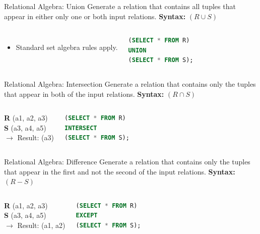 \begin{frame}[fragile]{Relational Algebra: Union}
    Generate a relation that contains all tuples that appear in either only one or both input relations.
    \vspace{1em}
    \textbf{Syntax:} $(R \cup S)$
    \vspace{1em}
    \begin{columns}
        \begin{itemize}
            \item Standard set algebra rules apply.
        \end{itemize}
        \begin{lstlisting}[language=SQL]
(SELECT * FROM R)
UNION
(SELECT * FROM S);
        \end{lstlisting}
    \end{columns}
\end{frame}

\begin{frame}[fragile]{Relational Algebra: Intersection}
    Generate a relation that contains only the tuples that appear in both of the input relations.
    \vspace{1em}
    \textbf{Syntax:} $(R \cap S)$
    \vspace{1em}
    \begin{columns}
        \textbf{R} (a1, a2, a3) \\ \textbf{S} (a3, a4, a5) \\
        $\rightarrow$ Result: (a3)
        \begin{lstlisting}[language=SQL]
(SELECT * FROM R)
INTERSECT
(SELECT * FROM S);
        \end{lstlisting}
    \end{columns}
\end{frame}

\begin{frame}[fragile]{Relational Algebra: Difference}
    Generate a relation that contains only the tuples that appear in the first and not the second of the input relations.
    \vspace{1em}
    \textbf{Syntax:} $(R - S)$
    \vspace{1em}
    \begin{columns}
        \textbf{R} (a1, a2, a3) \\ \textbf{S} (a3, a4, a5) \\
        $\rightarrow$ Result: (a1, a2)
        \begin{lstlisting}[language=SQL]
(SELECT * FROM R)
EXCEPT
(SELECT * FROM S);
        \end{lstlisting}
    \end{columns}
\end{frame}

